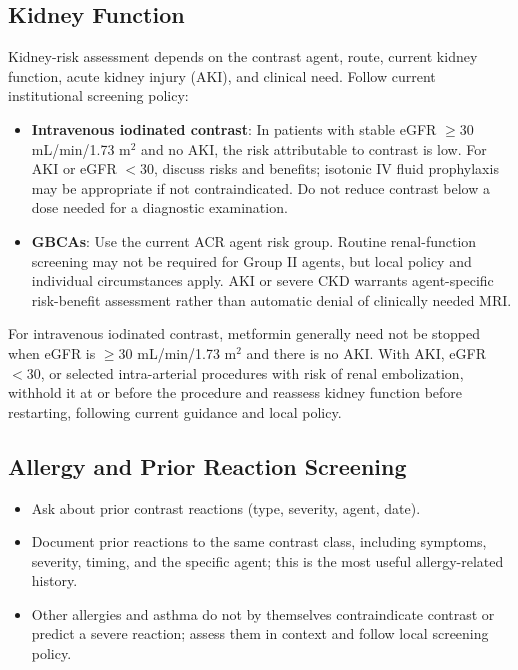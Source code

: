 \subsection*{Kidney Function}
Kidney-risk assessment depends on the contrast agent, route, current kidney function, acute kidney injury (AKI), and clinical need. Follow current institutional screening policy:
\begin{itemize}
    \item \textbf{Intravenous iodinated contrast}: In patients with stable eGFR $\geq30$ mL/min/1.73 m$^2$ and no AKI, the risk attributable to contrast is low. For AKI or eGFR $<30$, discuss risks and benefits; isotonic IV fluid prophylaxis may be appropriate if not contraindicated. Do not reduce contrast below a dose needed for a diagnostic examination.
    \item \textbf{GBCAs}: Use the current ACR agent risk group. Routine renal-function screening may not be required for Group II agents, but local policy and individual circumstances apply. AKI or severe CKD warrants agent-specific risk-benefit assessment rather than automatic denial of clinically needed MRI.
\end{itemize}

\begin{warnbox}
For intravenous iodinated contrast, metformin generally need not be stopped when eGFR is $\geq30$ mL/min/1.73 m$^2$ and there is no AKI. With AKI, eGFR $<30$, or selected intra-arterial procedures with risk of renal embolization, withhold it at or before the procedure and reassess kidney function before restarting, following current guidance and local policy.
\end{warnbox}

\subsection*{Allergy and Prior Reaction Screening}
\begin{itemize}
    \item Ask about prior contrast reactions (type, severity, agent, date).
    \item Document prior reactions to the same contrast class, including symptoms, severity, timing, and the specific agent; this is the most useful allergy-related history.
    \item Other allergies and asthma do not by themselves contraindicate contrast or predict a severe reaction; assess them in context and follow local screening policy.
\end{itemize}

